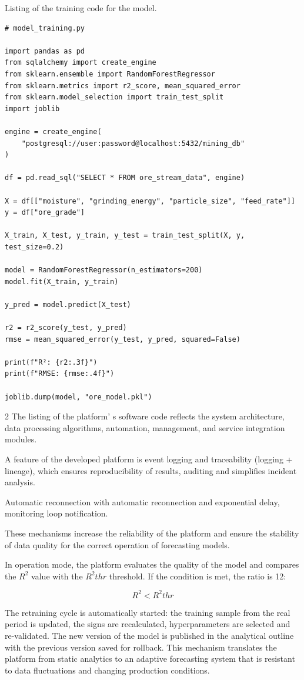Listing of the training code for the model.

{\small
\begin{verbatim}
# model_training.py

import pandas as pd
from sqlalchemy import create_engine
from sklearn.ensemble import RandomForestRegressor
from sklearn.metrics import r2_score, mean_squared_error
from sklearn.model_selection import train_test_split
import joblib

engine = create_engine(
    "postgresql://user:password@localhost:5432/mining_db"
)

df = pd.read_sql("SELECT * FROM ore_stream_data", engine)

X = df[["moisture", "grinding_energy", "particle_size", "feed_rate"]]
y = df["ore_grade"]

X_train, X_test, y_train, y_test = train_test_split(X, y, test_size=0.2)

model = RandomForestRegressor(n_estimators=200)
model.fit(X_train, y_train)

y_pred = model.predict(X_test)

r2 = r2_score(y_test, y_pred)
rmse = mean_squared_error(y_test, y_pred, squared=False)

print(f"R²: {r2:.3f}")
print(f"RMSE: {rmse:.4f}")

joblib.dump(model, "ore_model.pkl")
\end{verbatim}
}

\begin{multicols}{2}
The listing of the platform' s software code reflects the
system architecture, data processing algorithms, automation, management,
and service integration modules.

A feature of the developed platform is event logging and traceability
(logging + lineage), which ensures reproducibility of results, auditing
and simplifies incident analysis.

Automatic reconnection with automatic reconnection and exponential
delay, monitoring loop notification.

These mechanisms increase the reliability of the platform and ensure the
stability of data quality for the correct operation of forecasting
models.

In operation mode, the platform evaluates the quality of the model and
compares the \(R^{2}\) value with the \(R^{2}thr\)
threshold. If the condition is met, the ratio is 12:

\begin{equation}
R^2 < R^{2}thr
\end{equation}

The retraining cycle is automatically started: the training sample from
the real period is updated, the signs are recalculated, hyperparameters
are selected and re-validated. The new version of the model is published
in the analytical outline with the previous version saved for rollback.
This mechanism translates the platform from static analytics to an
adaptive forecasting system that is resistant to data fluctuations and
changing production conditions.
\end{multicols}

